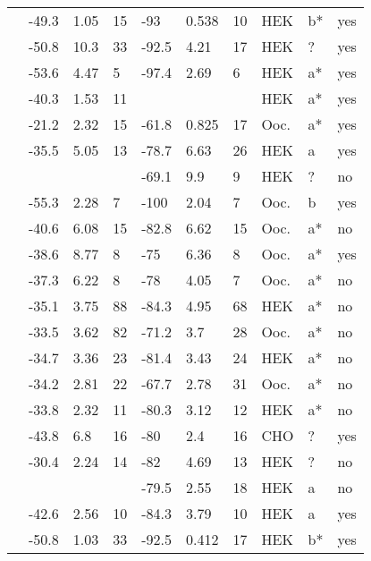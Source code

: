 \begin{footnotesize}
\begin{longtable}{p{5cm}|lll|lll|lll}
\citet{Cordeiro2006MutationDB} & -49.3 & 1.05 & 15 & -93 & 0.538 & 10 & HEK & b* & yes \\
\citet{Crotti2012aMutationDB} & -50.8 & 10.3 & 33 & -92.5 & 4.21 & 17 & HEK & ? & yes \\
\citet{Deschenes2000MutationDB} & -53.6 & 4.47 & 5 & -97.4 & 2.69 & 6 & HEK & a* & yes \\
\citet{Detta2014MutationDB} & -40.3 & 1.53 & 11 & && & HEK & a* & yes \\
\citet{Ellinor2008MutationDB} & -21.2 & 2.32 & 15 & -61.8 & 0.825 & 17 & Ooc. & a* & yes \\
\citet{Ge2008MutationDB} & -35.5 & 5.05 & 13 & -78.7 & 6.63 & 26 & HEK & a & yes \\
\citet{Glaaser2012MutationDB} & && & -69.1 & 9.9 & 9 & HEK & ? & no \\
\citet{GosselinBadaroudine2012MutationDB} & -55.3 & 2.28 & 7 & -100 & 2.04 & 7 & Ooc. & b & yes \\
\citet{Groenewegen2003aMutationDB} & -40.6 & 6.08 & 15 & -82.8 & 6.62 & 15 & Ooc. & a* & no \\
\citet{Groenewegen2003aMutationDB} & -38.6 & 8.77 & 8 & -75 & 6.36 & 8 & Ooc. & a* & yes \\
\citet{Groenewegen2003bMutationDB} & -37.3 & 6.22 & 8 & -78 & 4.05 & 7 & Ooc. & a* & no \\
\citet{Guetter2013MutationDB} & -35.1 & 3.75 & 88 & -84.3 & 4.95 & 68 & HEK & a* & no \\
\citet{Guetter2013MutationDB} & -33.5 & 3.62 & 82 & -71.2 & 3.7 & 28 & Ooc. & a* & no \\
\citet{Gui2010aMutationDB} & -34.7 & 3.36 & 23 & -81.4 & 3.43 & 24 & HEK & a* & no \\
\citet{Gui2010aMutationDB} & -34.2 & 2.81 & 22 & -67.7 & 2.78 & 31 & Ooc. & a* & no \\
\citet{Gui2010bMutationDB} & -33.8 & 2.32 & 11 & -80.3 & 3.12 & 12 & HEK & a* & no \\
\citet{Hayashi2015MutationDB} & -43.8 & 6.8 & 16 & -80 & 2.4 & 16 & CHO & ? & yes \\
\citet{Holst2009MutationDB} & -30.4 & 2.24 & 14 & -82 & 4.69 & 13 & HEK & ? & no \\
\citet{Hoshi2014MutationDB} & && & -79.5 & 2.55 & 18 & HEK & a & no \\
\citet{Hsueh2009MutationDB} & -42.6 & 2.56 & 10 & -84.3 & 3.79 & 10 & HEK & a & yes \\
\citet{Hu2007MutationDB} & -50.8 & 1.03 & 33 & -92.5 & 0.412 & 17 & HEK & b* & yes \\

\end{longtable}
\end{footnotesize}
